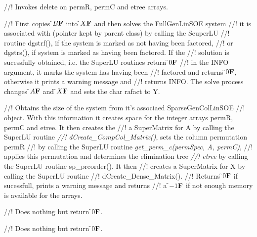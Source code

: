 //! Invokes delete on \p permR, \p permC and \p etree arrays.


//! First copies \f$B{\bf F}$ into \f$X{\bf F}$ and then solves the FullGenLinSOE system 
//! it is associated with (pointer kept by parent class) by calling the SeuperLU
//! routine dgstrf(), if the system is marked as not having been factored,
//! or dgstrs(), if system is marked as having been factored. If the
//! solution is sucessfully obtained, i.e. the SuperLU routines return \f$0{\bf F}$
//! in the INFO argument, it marks the system has having been
//! factored and returns \f$0{\bf F}$, otherwise it prints a warning message and
//! returns INFO. The solve process changes \f$A{\bf F}$ and \f$X{\bf F}$ and sets the char
\p rafact to \p Y.   

//! Obtains the size of the system from it's associaed SparseGenColLinSOE
//! object. With this information it creates space for the integer arrays
\p permR, \p permC and \p etree. It then creates the
//! a SuperMatrix for A by calling the SuperLU routine {\em
//! dCreate\_CompCol\_Matrix()}, sets the column permutation \p permR
//! by calling the SuperLU routine {\em get\_perm\_c(permSpec, A, permC)},
//! applies this permutation and determines the elimination tree {\em
//! etree} by calling the SuperLU routine sp\_preorder(). It then
//! creates a SuperMatrix for X by calling the SuperLU routine 
//! dCreate\_Dense\_Matrix().
//! Returns \f$0{\bf F}$ if sucessfull, prints a warning message and returns
//! a \f$-1{\bf F}$ if not enough memory is available for the arrays.


//! Does nothing but return \f$0{\bf F}$.

//! Does nothing but return \f$0{\bf F}$.








